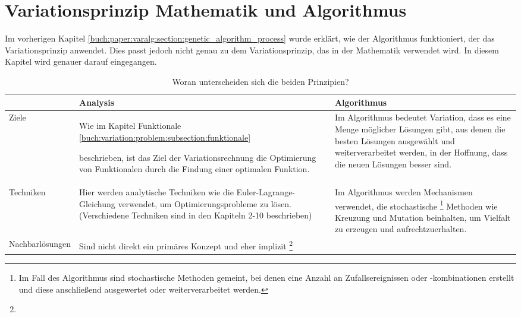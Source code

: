 %
%
%
%
\section{Variationsprinzip Mathematik und Algorithmus
\label{buch:paper:varalg:section:variations_math_algorithm_result}}
Im vorherigen Kapitel \ref{buch:paper:varalg:section:genetic_algorithm_process} wurde erklärt, 
wie der Algorithmus funktioniert, der das Variationsprinzip anwendet. Dies 
passt jedoch nicht genau zu dem Variationsprinzip, das in der Mathematik 
verwendet wird. In diesem Kapitel wird genauer darauf eingegangen.

\begin{table}[h]
   \centering
   \caption{Woran unterscheiden sich die beiden Prinzipien?}
   \begin{tabularx}{\textwidth}{|X|X|X|}
      \hline
       & Analysis 
       & Algorithmus 
       \\ \hline
      Ziele  
       & Wie im Kapitel Funktionale \ref{buch:variation:problem:subsection:funktionale}

      beschrieben, ist das Ziel der Variationsrechnung die Optimierung von Funktionalen 
      durch die Findung einer optimalen Funktion.
       & Im Algorithmus bedeutet Variation, dass es eine Menge möglicher Lösungen gibt, 
      aus denen die besten Lösungen ausgewählt und weiterverarbeitet werden, in der 
      Hoffnung, dass die neuen Lösungen besser sind.
      \\ \hline
      Techniken  
       & Hier werden analytische Techniken wie die Euler-Lagrange-Gleichung verwendet, 
      um Optimierungsprobleme zu lösen. (Verschiedene Techniken sind in den Kapiteln 
      2-10 beschrieben)
       & Im Algorithmus werden Mechanismen verwendet, die stochastische 
      \footnote{
         Im Fall des Algorithmus sind stochastische Methoden gemeint, bei denen 
         eine Anzahl an Zufallsereignissen oder -kombinationen erstellt und 
         diese anschließend ausgewertet oder weiterverarbeitet werden.
      }
      Methoden wie Kreuzung und Mutation beinhalten, um Vielfalt zu erzeugen und aufrechtzuerhalten.
      \\ \hline
      Nachbarlösungen
       & Sind nicht direkt ein primäres Konzept und eher implizit \footnote{

}
\end{tabularx}
\end{table}
